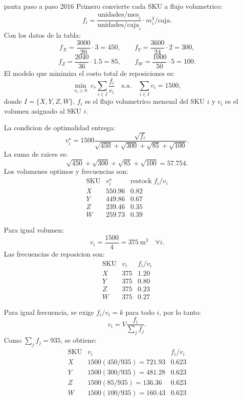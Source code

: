 \begin{pautacompleta}{pauta paso a paso 2016}
Primero convierte cada SKU a flujo volumetrico:
\[
  f_i=\frac{\text{unidades/mes}_i}{\text{unidades/caja}_i}\cdot m_i^3/\text{caja}.
\]
Con los datos de la tabla:
\[
  f_X=\frac{3000}{20}\cdot 3=450,\qquad
  f_Y=\frac{3600}{24}\cdot 2=300,
\]
\[
  f_Z=\frac{2040}{36}\cdot 1.5=85,\qquad
  f_W=\frac{1000}{50}\cdot 5=100.
\]
El modelo que minimiza el costo total de reposiciones es:
\[
  \min_{v_i\geq 0}\; c_r\sum_{i\in I}\frac{f_i}{v_i}
  \quad\text{s.a.}\quad
  \sum_{i\in I} v_i=1500,
\]
donde $I=\{X,Y,Z,W\}$, $f_i$ es el flujo volumetrico mensual del SKU $i$ y $v_i$ es el volumen asignado al SKU $i$.

La condicion de optimalidad entrega:
\[
  v_i^\star=1500\frac{\sqrt{f_i}}{\sqrt{450}+\sqrt{300}+\sqrt{85}+\sqrt{100}}.
\]
La suma de raices es:
\[
  \sqrt{450}+\sqrt{300}+\sqrt{85}+\sqrt{100}=57.754.
\]
Los volumenes optimos y frecuencias son:
\[
\begin{array}{c|cc}
\text{SKU} & v_i^\star & \text{restock } f_i/v_i\\
\hline
X&550.96&0.82\\
Y&449.86&0.67\\
Z&239.46&0.35\\
W&259.73&0.39
\end{array}
\]

Para igual volumen:
\[
  v_i=\frac{1500}{4}=375\ \text{m}^3\quad \forall i.
\]
Las frecuencias de reposicion son:
\[
\begin{array}{c|cc}
\text{SKU} & v_i & f_i/v_i\\
\hline
X&375&1.20\\
Y&375&0.80\\
Z&375&0.23\\
W&375&0.27
\end{array}
\]

Para igual frecuencia, se exige $f_i/v_i=k$ para todo $i$, por lo tanto:
\[
  v_i=V\frac{f_i}{\sum_j f_j}.
\]
Como $\sum_j f_j=935$, se obtiene:
\[
\begin{array}{c|cc}
\text{SKU} & v_i & f_i/v_i\\
\hline
X&1500(450/935)=721.93&0.623\\
Y&1500(300/935)=481.28&0.623\\
Z&1500(85/935)=136.36&0.623\\
W&1500(100/935)=160.43&0.623
\end{array}
\]
\end{pautacompleta}

